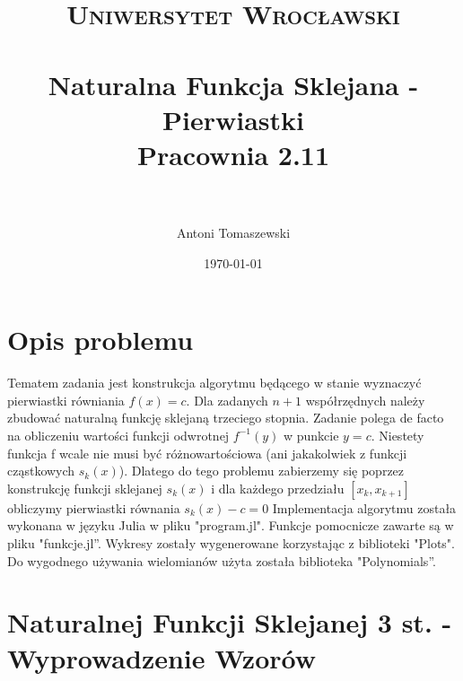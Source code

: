 \documentclass[paper=a4, fontsize=11pt]{scrartcl} %
\title{	
\normalfont \normalsize 
\textsc{Uniwersytet Wrocławski} \\ [25pt] %
\horrule{0.5pt} \\[0.4cm] %
\huge Naturalna Funkcja Sklejana - Pierwiastki \\
\large Pracownia 2.11 \\ %
\horrule{2pt} \\[0.5cm] %
}
\author{Antoni Tomaszewski} %
\date{\normalsize\today} %
\numberwithin{equation}{section} %
\numberwithin{figure}{section} %
\numberwithin{table}{section} %
\begin{document}
\maketitle %


\section{Opis problemu}

Tematem zadania jest konstrukcja algorytmu będącego w stanie wyznaczyć pierwiastki równiania $f(x) = c$. Dla zadanych $n+1$ współrzędnych należy zbudować naturalną funkcję sklejaną trzeciego stopnia. Zadanie polega de facto na obliczeniu wartości funkcji odwrotnej $f^{-1}(y)$ w punkcie $y=c$. Niestety funkcja f wcale nie musi być różnowartościowa (ani jakakolwiek z funkcji cząstkowych $s_{k}(x)$). Dlatego do tego problemu zabierzemy się poprzez konstrukcję funkcji sklejanej $s_{k}(x)$ i dla każdego przedziału $[x_{k},x_{k+1}]$ obliczymy pierwiastki równania $s_{k}(x)-c = 0$ %
\medbreak
Implementacja algorytmu została wykonana w języku Julia w pliku "program.jl".
Funkcje pomocnicze zawarte są w pliku "funkcje.jl''.
Wykresy zostały wygenerowane korzystając z biblioteki "Plots".
Do wygodnego używania wielomianów użyta została biblioteka "Polynomials''.

\section{Naturalnej Funkcji Sklejanej 3 st. - Wyprowadzenie Wzorów}
\end{document}
